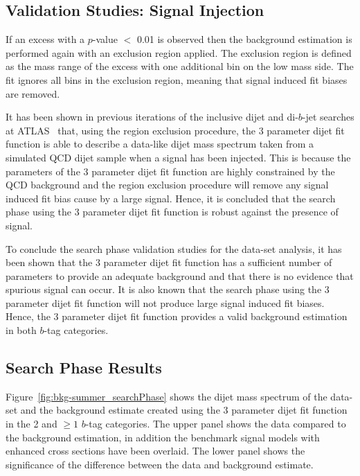 \subsection{Validation Studies: Signal Injection}
\label{sec:bkg-summer_sigInj}

\vspace{-0.25em}
If an excess with a  \bh{} $p$-value $<$ 0.01 is observed then the background estimation is
performed again with an exclusion region applied.
The exclusion region is defined as the mass range of the excess with one additional bin on the low mass side.
The fit ignores all bins in the exclusion region, meaning that signal induced fit biases are removed.

It has been shown in previous iterations of the inclusive dijet and di-$b$-jet searches at ATLAS~\cite{dijet-mori16_paper,dibjet-mori16_paper} that,
using the region exclusion procedure, the 3 parameter dijet fit function is able to describe a data-like dijet mass spectrum
taken from a simulated QCD dijet sample when a signal has been injected.
This is because the parameters of the 3 parameter dijet fit function are highly constrained by the QCD background
and the region exclusion procedure will remove any signal induced fit bias cause by a large signal.
Hence, it is concluded that the search phase using the 3 parameter dijet fit function is robust against the presence of signal.

To conclude the search phase validation studies for the \summer{} data-set analysis,
it has been shown that the 3 parameter dijet fit function has a
sufficient number of parameters to provide an adequate background
and that there is no evidence that spurious signal can occur.
It is also known that the search phase using the 3 parameter dijet fit function
will not produce large signal induced fit biases.
Hence, the 3 parameter dijet fit function
provides a valid background estimation in both $b$-tag categories.

\subsection{Search Phase Results}
\label{sec:bkg-summer_results}

\vspace{-0.5em}
Figure~\ref{fig:bkg-summer_searchPhase} shows the dijet mass spectrum of the
\summer{} data-set and the background estimate created using the 3 parameter dijet fit function
in the 2 and $\geq1$ $b$-tag categories.
The upper panel shows the data compared to the background estimation,
in addition the benchmark signal models with enhanced cross sections have been overlaid.
The lower panel shows the significance of the difference between the data and background estimate.

